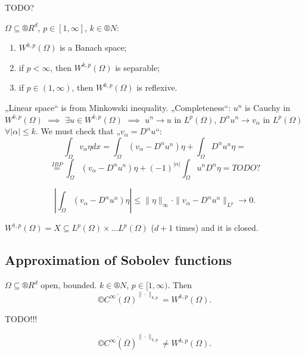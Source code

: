 \documentclass[12pt]{article}					%
\begin{document}

TODO?

\begin{veta}
	$Ω \subseteq ®R^d$, $p \in [1, ∞]$, $k \in ®N$:
	\begin{enumerate}
		\item $W^{k, p}(Ω)$ is a Banach space;
		\item if $p < ∞$, then $W^{k, p}(Ω)$ is separable;
		\item if $p \in (1, ∞)$, then $W^{k, p}(Ω)$ is reflexive.
	\end{enumerate}

	\begin{dukazin}[1.]
		„Linear space“ is from Minkowski inequality. „Completeness“: $u^n$ is Cauchy in $W^{k, p}(Ω)$ $\implies$ $\exists u \in W^{k, p}(Ω)$ $\implies$ $u^n \rightarrow u$ in $L^p(Ω)$, $D^α u^n \rightarrow v_α$ in $L^p(Ω)$ $\forall |α| ≤ k$. We must check that „$v_α = D^α u$“:
		$$ \int_Ω v_α η dx = \int_Ω (v_α - D^α u^n)η + \int_Ω D^α u^n η = $$
		$$ \overset{IBP}= \int_Ω (v_α - D^α u^n)η + (-1)^{|α|} \int_Ω u^n D^αη = TODO? $$
		
		$$ |\int_Ω (v_α - D^α u^n)η| ≤ \|η\|_∞·\|v_α - D^α u^n\|_{L^p} \rightarrow 0. $$
	\end{dukazin}
	
	\begin{dukazin}[2. + 3. for $W^{1, p}(Ω)$]
		$W^{1, p}(Ω) = X \subseteq L^p(Ω) \times … L^p(Ω)$ ($d + 1$ times) and it is closed.
	\end{dukazin}
\end{veta}

\subsection{Approximation of Sobolev functions}
\begin{veta}
	$Ω \subseteq ®R^d$ open, bounded. $k \in ®N$, $p \in [1, ∞)$. Then
	$$ \overline{©C^∞(Ω)}^{\|·\|_{k, p}} = W^{k, p}(Ω). $$

	\begin{dukazin}
		TODO!!!
	\end{dukazin}
\end{veta}

\begin{upozorneni}
	$$ \overline{©C^∞(\overline{Ω})}^{\|·\|_{k, p}} ≠ W^{k, p}(Ω). $$
\end{upozorneni}
\end{document}

